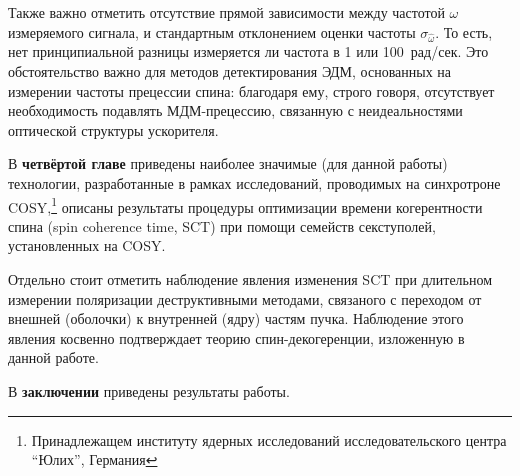 Также важно отметить отсутствие прямой зависимости между частотой $\omega$ измеряемого сигнала, 
и стандартным отклонением оценки частоты $\sigma_{\hat\omega}$. То есть, нет принципиальной разницы
измеряется ли частота в 1 или 100~рад/сек. Это обстоятельство важно для методов детектирования ЭДМ, 
основанных на измерении частоты прецессии спина: благодаря ему, строго говоря, 
отсутствует необходимость подавлять МДМ-прецессию, связанную с неидеальностями 
оптической структуры ускорителя.


В \textbf{четвёртой главе} приведены наиболее значимые (для данной работы) технологии, разработанные в рамках исследований, проводимых на синхротроне COSY,\footnote{Принадлежащем институту ядерных исследований исследовательского центра ``Юлих'', Германия} описаны результаты процедуры оптимизации времени когерентности спина (spin coherence time, SCT) при помощи семейств секступолей, установленных на COSY. 

Отдельно стоит отметить наблюдение явления изменения SCT при длительном измерении поляризации деструктивными методами, связаного с переходом от внешней (оболочки) к внутренней (ядру) частям пучка. Наблюдение этого явления косвенно подтверждает теорию спин-декогеренции, изложенную в данной работе.

В \textbf{заключении} приведены результаты работы.